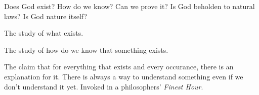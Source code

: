 \begin{problem}[God]
Does God exist? How do we know? Can we prove it? Is God beholden to natural laws? Is God nature itself?
\end{problem}

\begin{definition}[Metaphysics]
The study of what exists.
\end{definition}

\begin{definition}[Epistemology]
The study of how do we know that something exists.
\end{definition}

\begin{definition}
The claim that for everything that exists and every occurance, there is an explanation for it. There is always a way to understand something even if we don't understand it yet. Invoked in a philosophers' \emph{Finest Hour}.
\end{definition}